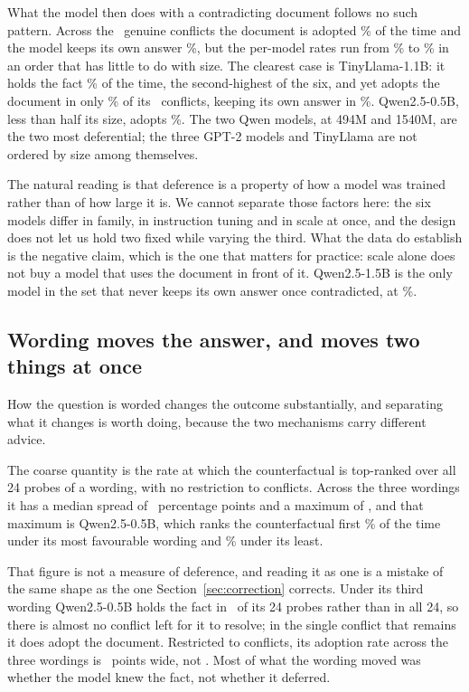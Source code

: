 \documentclass{article}
\begin{document}
What the model then does with a contradicting document follows no such pattern.
Across the \NConflict\ genuine conflicts the document is adopted
\AdoptConflict\% of the time and the model keeps its own answer \KeepConflict\%,
but the per-model rates run from \AdoptMin\% to \AdoptMax\% in an order that has
little to do with size. The clearest case is TinyLlama-1.1B: it holds the fact
\KnowsTiny\% of the time, the second-highest of the six, and yet adopts the
document in only \AdoptTiny\% of its \NConflictTiny\ conflicts, keeping its own
answer in \KeepTiny\%. Qwen2.5-0.5B, less than half its size, adopts
\AdoptQwenSmall\%. The two Qwen models, at 494M and 1540M, are the two most
deferential; the three GPT-2 models and TinyLlama are not ordered by size among
themselves.

The natural reading is that deference is a property of how a model was trained
rather than of how large it is. We cannot separate those factors here: the six
models differ in family, in instruction tuning and in scale at once, and the
design does not let us hold two fixed while varying the third. What the data do
establish is the negative claim, which is the one that matters for practice:
scale alone does not buy a model that uses the document in front of it.
Qwen2.5-1.5B is the only model in the set that never keeps its own answer once
contradicted, at \KeepQwenLarge\%.

\subsection{Wording moves the answer, and moves two things at once}
\label{sec:phrasing}

How the question is worded changes the outcome substantially, and separating
what it changes is worth doing, because the two mechanisms carry different
advice.

The coarse quantity is the rate at which the counterfactual is top-ranked over
all 24 probes of a wording, with no restriction to conflicts. Across the three
wordings it has a median spread of \MedianPhrasingSpread\ percentage points and
a maximum of \MaxPhrasingSpread, and that maximum is Qwen2.5-0.5B, which ranks
the counterfactual first \QwenSmallBest\% of the time under its most favourable
wording and \QwenSmallWorst\% under its least.

That figure is not a measure of deference, and reading it as one is a mistake of
the same shape as the one Section~\ref{sec:correction} corrects. Under its third
wording Qwen2.5-0.5B holds the fact in \QwenSmallConflictsWorst\ of its 24
probes rather than in all 24, so there is almost no conflict left
for it to resolve; in the single conflict that remains it does adopt the
document. Restricted to conflicts, its adoption rate across the three wordings
is \QwenSmallAdoptSpread\ points wide, not \MaxPhrasingSpread. Most of what the
wording moved was whether the model knew the fact, not whether it deferred.
\end{document}
